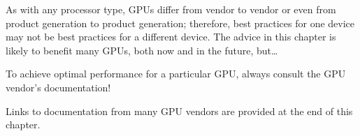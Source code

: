 As with any processor type, GPUs differ from vendor to vendor or even from product generation to product generation; therefore, best practices for one device may not be best practices for a different device. The advice in this chapter is likely to benefit many GPUs, both now and in the future, but…\par

\begin{tcolorbox}[colback=red!5!white,colframe=red!75!black]
To achieve optimal performance for a particular GPU, always consult the GPU vendor’s documentation!
\end{tcolorbox}

Links to documentation from many GPU vendors are provided at the end of this chapter.\par






















































